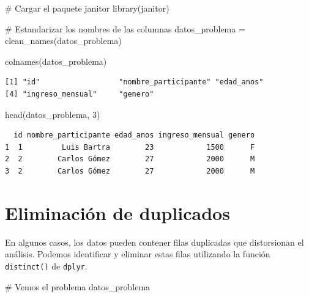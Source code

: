 \documentclass[
  letterpaper,
  DIV=11,
  numbers=noendperiod,
  twoside]{scrreprt}
\newenvironment{Shaded}{\begin{snugshade}}{\end{snugshade}}
\newcommand{\CommentTok}[1]{\textcolor[rgb]{0.37,0.37,0.37}{#1}}
\newcommand{\DecValTok}[1]{\textcolor[rgb]{0.68,0.00,0.00}{#1}}
\newcommand{\FunctionTok}[1]{\textcolor[rgb]{0.28,0.35,0.67}{#1}}
\newcommand{\NormalTok}[1]{\textcolor[rgb]{0.00,0.23,0.31}{#1}}
\newcommand{\OtherTok}[1]{\textcolor[rgb]{0.00,0.23,0.31}{#1}}
\begin{document}
\begin{Shaded}
\begin{Highlighting}[]
\CommentTok{\# Cargar el paquete janitor}
\FunctionTok{library}\NormalTok{(janitor)}

\CommentTok{\# Estandarizar los nombres de las columnas}
\NormalTok{datos\_problema }\OtherTok{=} \FunctionTok{clean\_names}\NormalTok{(datos\_problema)}
\end{Highlighting}
\end{Shaded}

\begin{Shaded}
\begin{Highlighting}[]
\FunctionTok{colnames}\NormalTok{(datos\_problema)}
\end{Highlighting}
\end{Shaded}

\begin{verbatim}
[1] "id"                  "nombre_participante" "edad_anos"          
[4] "ingreso_mensual"     "genero"             
\end{verbatim}

\begin{Shaded}
\begin{Highlighting}[]
\FunctionTok{head}\NormalTok{(datos\_problema, }\DecValTok{3}\NormalTok{)}
\end{Highlighting}
\end{Shaded}

\begin{verbatim}
  id nombre_participante edad_anos ingreso_mensual genero
1  1         Luis Bartra        23            1500      F
2  2        Carlos Gómez        27            2000      M
3  2        Carlos Gómez        27            2000      M
\end{verbatim}

\section{Eliminación de duplicados}\label{eliminaciuxf3n-de-duplicados}

En algunos casos, los datos pueden contener filas duplicadas que
distorsionan el análisis. Podemos identificar y eliminar estas filas
utilizando la función \texttt{distinct()} de \texttt{dplyr}.

\begin{Shaded}
\begin{Highlighting}[]
\CommentTok{\# Vemos el problema}
\NormalTok{datos\_problema}
\end{Highlighting}
\end{Shaded}
\end{document}
